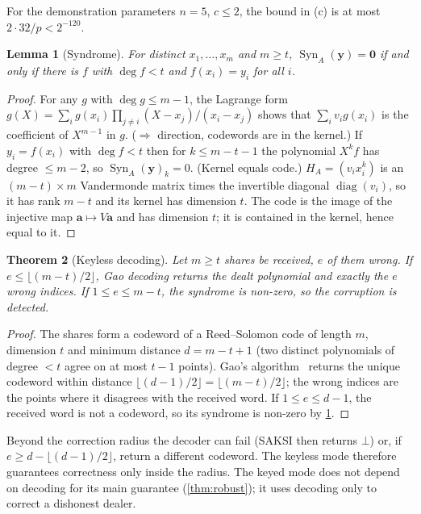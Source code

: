 \documentclass[11pt,a4paper]{article}
\theoremstyle{plain}
\newtheorem{theorem}{Theorem}
\newtheorem{lemma}[theorem]{Lemma}
\theoremstyle{definition}
\newcommand{\bad}{\bot}
\DeclareMathOperator{\Syn}{Syn}
\begin{document}
For the demonstration parameters $n=5$, $c\le2$, the bound in (c) is at most $2\cdot32/p<2^{-120}$.

\begin{lemma}[Syndrome]\label{lem:syn}
For distinct $x_1,\dots,x_m$ and $m\ge t$, $\Syn_A(\mathbf y)=\mathbf 0$ if and only if there is $f$
with $\deg f<t$ and $f(x_i)=y_i$ for all $i$.
\end{lemma}
\begin{proof}
For any $g$ with $\deg g\le m-1$, the Lagrange form
$g(X)=\sum_i g(x_i)\prod_{j\ne i}(X-x_j)/(x_i-x_j)$ shows that $\sum_i v_i g(x_i)$ is the coefficient
of $X^{m-1}$ in $g$. ($\Rightarrow$ direction, codewords are in the kernel.) If $y_i=f(x_i)$ with
$\deg f<t$ then for $k\le m-t-1$ the polynomial $X^kf$ has degree $\le m-2$, so
$\Syn_A(\mathbf y)_k=0$. (Kernel equals code.) $H_A=(v_ix_i^k)$ is an $(m-t)\times m$ Vandermonde matrix
times the invertible diagonal $\operatorname{diag}(v_i)$, so it has rank $m-t$ and its kernel has
dimension $t$. The code is the image of the injective map $\mathbf a\mapsto V\mathbf a$ and has
dimension $t$; it is contained in the kernel, hence equal to it.
\end{proof}

\begin{theorem}[Keyless decoding]\label{thm:keyless}
Let $m\ge t$ shares be received, $e$ of them wrong. If $e\le\lfloor(m-t)/2\rfloor$, Gao decoding
returns the dealt polynomial and exactly the $e$ wrong indices. If $1\le e\le m-t$, the syndrome
is non-zero, so the corruption is detected.
\end{theorem}
\begin{proof}
The shares form a codeword of a Reed--Solomon code of length $m$, dimension $t$ and minimum
distance $d=m-t+1$ (two distinct polynomials of degree $<t$ agree on at most $t-1$ points). Gao's
algorithm~\cite{gao02} returns the unique codeword within distance $\lfloor(d-1)/2\rfloor=
\lfloor(m-t)/2\rfloor$; the wrong indices are the points where it disagrees with the received
word. If $1\le e\le d-1$, the received word is not a codeword, so its syndrome is non-zero by
\cref{lem:syn}.
\end{proof}

Beyond the correction radius the decoder can fail (SAKSI then returns $\bad$) or, if
$e\ge d-\lfloor(d-1)/2\rfloor$, return a different codeword. The keyless mode therefore guarantees
correctness only inside the radius. The keyed mode does not depend on decoding for its main
guarantee (\cref{thm:robust}); it uses decoding only to correct a dishonest dealer.
\end{document}
